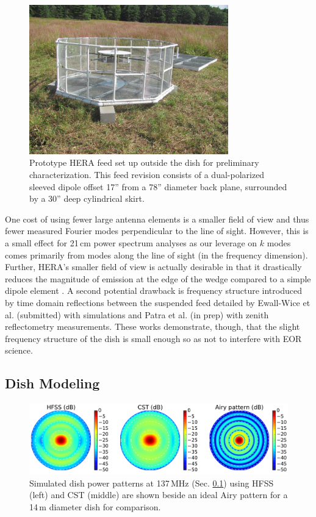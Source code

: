 \documentclass{emulateapj}
\begin{document}
\begin{figure}[h]
\includegraphics[width=3.4in]{feed.jpg}
\caption{Prototype HERA feed set up outside the dish for preliminary characterization. This feed revision consists of a dual-polarized sleeved dipole offset 17'' from a 78'' diameter back plane, surrounded by a 30'' deep cylindrical skirt.}
\label{fig:feedphoto}
\end{figure}

One cost of using fewer large antenna elements is a smaller field of view and thus fewer measured Fourier modes perpendicular to the line of sight. 
However, this is a 
small effect for 21\,cm power spectrum analyses as our leverage on $k$ modes comes primarily from modes along the line of sight (in the frequency dimension). Further, HERA's smaller field of view is actually desirable in that it drastically reduces the magnitude of emission at the edge of the wedge compared to a simple dipole element \citep{nithya15}. A second potential drawback is frequency structure introduced by time domain reflections between the suspended feed detailed by Ewall-Wice et al. (submitted) with simulations and Patra et al. (in prep) with zenith reflectometry measurements. These works demonstrate, though, that the slight frequency structure of the dish is small enough so as not to interfere with EOR science.

\subsection{Dish Modeling}
\label{sec:dishmodels}

\begin{figure}
\centering
\includegraphics[width=7in]{dave197_rich195_airy_beams.pdf}
\caption{Simulated dish power patterns at 137\,MHz (Sec. \ref{sec:dishmodels}) using HFSS (left) and CST (middle) are shown beside an ideal Airy pattern for a 14\,m diameter dish for comparison.}
\label{fig:modelbeams}
\end{figure}
\end{document}

